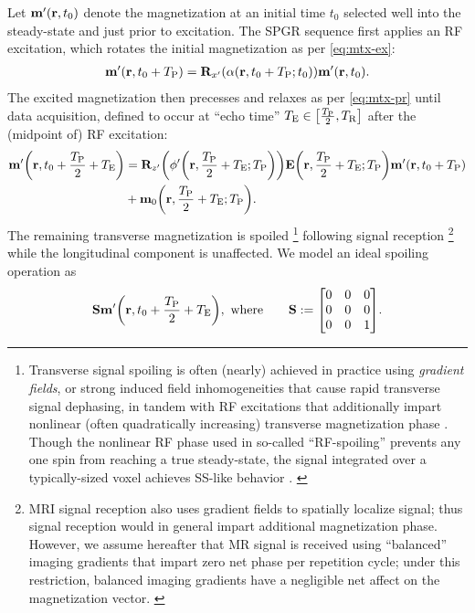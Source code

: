 Let $\bmmp\prtz$ denote the magnetization
at an initial time $t_0$ 
selected well into the steady-state
and just prior to excitation.
The SPGR sequence first applies
an RF excitation, 
which rotates the initial magnetization
as per \eqref{eq:mtx-ex}:
\begin{align}
	\bmmp\paren{\bmr,t_0+\TP} = \bmRxp{\flip\prtzt{t_0+\TP}} \bmmp\prtz.
	\label{eq:spgr-ex}
\end{align}
The excited magnetization 
then precesses and relaxes
as per \eqref{eq:mtx-pr}
until data acquisition,
defined to occur at
``echo time'' $\TE \in \brac{\frac{\TP}{2},\TR}$
after the (midpoint of) RF excitation:
\begin{align}
	\bmmp\paren{\bmr,t_0+\frac{\TP}{2}+\TE} &=
	\bmRzp{\php\paren{\bmr,\frac{\TP}{2}+\TE;\TP}} 
	\bmE\paren{\bmr,\frac{\TP}{2}+\TE;\TP} \bmmp\paren{\bmr,t_0+\TP} \nonumber \\
	&+ \bmmzero\paren{\bmr,\frac{\TP}{2}+\TE;\TP}.
	\label{eq:spgr-daq}
\end{align}
The remaining transverse magnetization is spoiled
\footnote{Transverse signal spoiling 
	is often (nearly) achieved in practice
	using \emph{gradient fields}, 
	or strong induced field inhomogeneities 
	that cause rapid transverse signal dephasing,
	in tandem with RF excitations
	that additionally impart nonlinear
	(often quadratically increasing)
	transverse magnetization phase
	\cite{zur:91:sot}.
	Though the nonlinear RF phase
	used in so-called ``RF-spoiling'' 
	prevents any one spin
	from reaching a true steady-state,
	the signal integrated
	over a typically-sized voxel
	achieves SS-like behavior
	\cite{denolin:05:nii}.
	\label{foot:spoil}
}
following signal reception
\footnote{MRI signal reception 
	also uses gradient fields
	to spatially localize signal;
	thus signal reception
	would in general 
	impart additional magnetization phase.
	However, 
	we assume hereafter
	that MR signal is received
	using ``balanced'' imaging gradients
	that impart zero net phase
	per repetition cycle;
	under this restriction,
	balanced imaging gradients
	have a negligible net affect
	on the magnetization vector.
	\label{foot:reception}
}
while the longitudinal component is unaffected.
We model an ideal spoiling
operation as
\begin{align}
	\bmS \bmmp\paren{\bmr,t_0+\frac{\TP}{2}+\TE}, \where \qquad
	\bmS := 
	\begin{bmatrix}
		0 & 0 & 0 \\
		0 & 0 & 0 \\
		0 & 0 & 1
	\end{bmatrix}.
	\label{eq:spgr-spoil}
\end{align}
